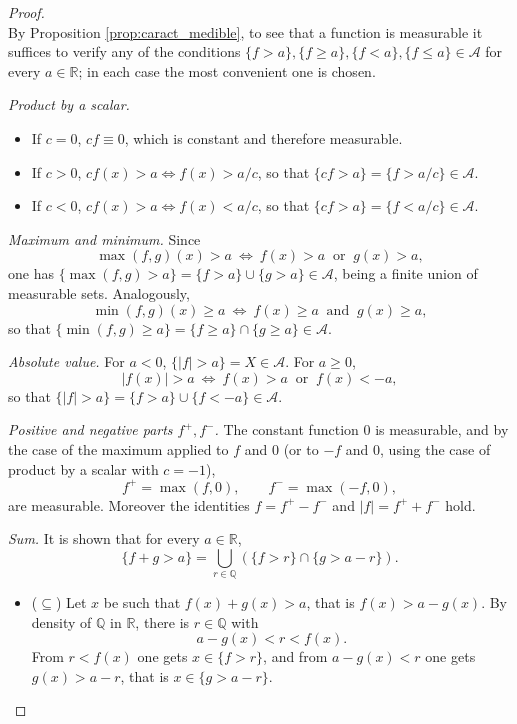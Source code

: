 \documentclass[11pt, a4paper]{article}
\begin{document}
\begin{proof}\leavevmode\\
By Proposition \ref{prop:caract_medible}, to see that a function is measurable it suffices to
verify any of the conditions $\{f > a\}, \{f \ge a\}, \{f < a\}, \{f \le a\} \in
\mathcal{A}$ for every $a \in \mathbb{R}$; in each case the most convenient one is chosen.

\textit{Product by a scalar.}
\begin{itemize}
    \item If $c = 0$, $cf \equiv 0$, which is constant and therefore measurable.
    \item If $c > 0$, $cf(x) > a \Leftrightarrow f(x) > a/c$, so that
    $\{cf > a\} = \{f > a/c\} \in \mathcal{A}$.
    \item If $c < 0$, $cf(x) > a \Leftrightarrow f(x) < a/c$, so that 
    $\{cf > a\} = \{f < a/c\} \in \mathcal{A}$.
\end{itemize}

\textit{Maximum and minimum.} Since
$$ \max(f, g)(x) > a \ \Leftrightarrow \ f(x) > a \ \text{ or } \ g(x) > a, $$
one has $\{\max(f, g) > a\} = \{f > a\} \cup \{g > a\} \in \mathcal{A}$, being a finite union
of measurable sets. Analogously,
$$ \min(f, g)(x) \ge a \ \Leftrightarrow \ f(x) \ge a \ \text{ and } \ g(x) \ge a, $$
so that $\{\min(f, g) \ge a\} = \{f \ge a\} \cap \{g \ge a\} \in \mathcal{A}$.

\textit{Absolute value.} For $a < 0$, $\{|f| > a\} = X \in \mathcal{A}$. For $a \ge 0$,
$$ |f(x)| > a \ \Leftrightarrow \ f(x) > a \ \text{ or } \ f(x) < -a, $$
so that $\{|f| > a\} = \{f > a\} \cup \{f < -a\} \in \mathcal{A}$.

\textit{Positive and negative parts $f^+, f^-$.} The constant function $0$ is measurable, and by the
case of the maximum applied to $f$ and $0$ (or to $-f$ and $0$, using the case of product by a scalar with
$c = -1$),
$$ f^+ = \max(f, 0), \qquad f^- = \max(-f, 0), $$
are measurable. Moreover the identities $f = f^+ - f^-$ and $|f| = f^+ + f^-$ hold.

\textit{Sum.} It is shown that for every $a \in \mathbb{R}$,
$$ \{f + g > a\} = \bigcup_{r \in \mathbb{Q}} \left( \{f > r\} \cap \{g > a - r\} \right). $$
\begin{itemize}
    \item ($\subseteq$) Let $x$ be such that $f(x) + g(x) > a$, that is $f(x) > a - g(x)$. By density of
    $\mathbb{Q}$ in $\mathbb{R}$, there is $r \in \mathbb{Q}$ with
    $$ a - g(x) < r < f(x). $$
    From $r < f(x)$ one gets $x \in \{f > r\}$, and from $a - g(x) < r$ one gets $g(x) > a - r$, that is $x \in
    \{g > a - r\}$.


\end{itemize}
\end{proof}
\end{document}
